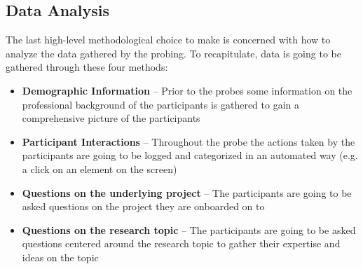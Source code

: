 \subsection{Data Analysis}

The last high-level methodological choice to make is concerned with how to analyze the data gathered by the probing. To recapitulate, data is going to be gathered through these four methods:

\begin{itemize}
  \item{\textbf{Demographic Information} -- Prior to the probes some information on the professional background of the participants is gathered to gain a comprehensive picture of the participants}
  \item{\textbf{Participant Interactions} -- Throughout the probe the actions taken by the participants are going to be logged and categorized in an automated way (e.g. a click on an element on the screen)}
  \item{\textbf{Questions on the underlying project} -- The participants are going to be asked questions on the project they are onboarded on to}
  \item{\textbf{Questions on the research topic} -- The participants are going to be asked questions centered around the research topic to gather their expertise and ideas on the topic}
\end{itemize}

